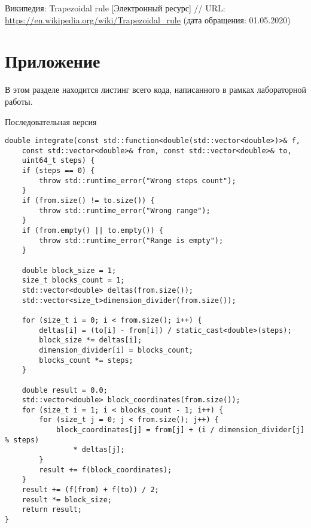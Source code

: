 \documentclass{report}
\begin{document}
\begin{thebibliography}{1}
 Википедия: Trapezoidal rule [Электронный ресурс] // URL: \url {https://en.wikipedia.org/wiki/Trapezoidal_rule} (дата обращения: 01.05.2020)
\end{thebibliography}
\newpage

\section*{Приложение}
В этом разделе находится листинг всего кода, написанного в рамках лабораторной работы.
\par Последовательная версия
\begin{lstlisting}
double integrate(const std::function<double(std::vector<double>)>& f,
    const std::vector<double>& from, const std::vector<double>& to,
    uint64_t steps) {
    if (steps == 0) {
        throw std::runtime_error("Wrong steps count");
    }
    if (from.size() != to.size()) {
        throw std::runtime_error("Wrong range");
    }
    if (from.empty() || to.empty()) {
        throw std::runtime_error("Range is empty");
    }

    double block_size = 1;
    size_t blocks_count = 1;
    std::vector<double> deltas(from.size());
    std::vector<size_t>dimension_divider(from.size());

    for (size_t i = 0; i < from.size(); i++) {
        deltas[i] = (to[i] - from[i]) / static_cast<double>(steps);
        block_size *= deltas[i];
        dimension_divider[i] = blocks_count;
        blocks_count *= steps;
    }

    double result = 0.0;
    std::vector<double> block_coordinates(from.size());
    for (size_t i = 1; i < blocks_count - 1; i++) {
        for (size_t j = 0; j < from.size(); j++) {
            block_coordinates[j] = from[j] + (i / dimension_divider[j] % steps)
                * deltas[j];
        }
        result += f(block_coordinates);
    }
    result += (f(from) + f(to)) / 2;
    result *= block_size;
    return result;
}
\end{lstlisting}
\end{document}
